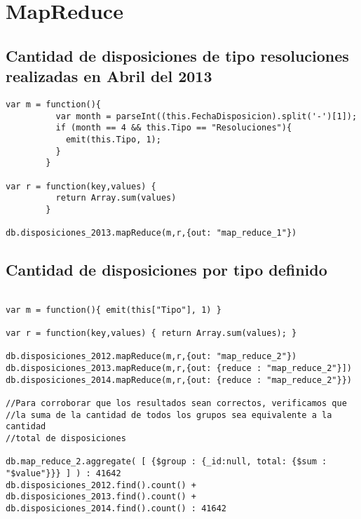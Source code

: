 \section{MapReduce}

\subsection{Cantidad de disposiciones de tipo resoluciones realizadas en Abril del 2013}

\begin{lstlisting}
var m = function(){
          var month = parseInt((this.FechaDisposicion).split('-')[1]);
          if (month == 4 && this.Tipo == "Resoluciones"){
            emit(this.Tipo, 1);
          }
        }

var r = function(key,values) {
          return Array.sum(values)
        }

db.disposiciones_2013.mapReduce(m,r,{out: "map_reduce_1"})
\end{lstlisting}

\vspace{4em}

\subsection{Cantidad de disposiciones por tipo definido}

\begin{lstlisting}

var m = function(){ emit(this["Tipo"], 1) }

var r = function(key,values) { return Array.sum(values); }

db.disposiciones_2012.mapReduce(m,r,{out: "map_reduce_2"})
db.disposiciones_2013.mapReduce(m,r,{out: {reduce : "map_reduce_2"}])
db.disposiciones_2014.mapReduce(m,r,{out: {reduce : "map_reduce_2"}})

//Para corroborar que los resultados sean correctos, verificamos que
//la suma de la cantidad de todos los grupos sea equivalente a la cantidad
//total de disposiciones

db.map_reduce_2.aggregate( [ {$group : {_id:null, total: {$sum : "$value"}}} ] ) : 41642
db.disposiciones_2012.find().count() +
db.disposiciones_2013.find().count() +
db.disposiciones_2014.find().count() : 41642
\end{lstlisting}


